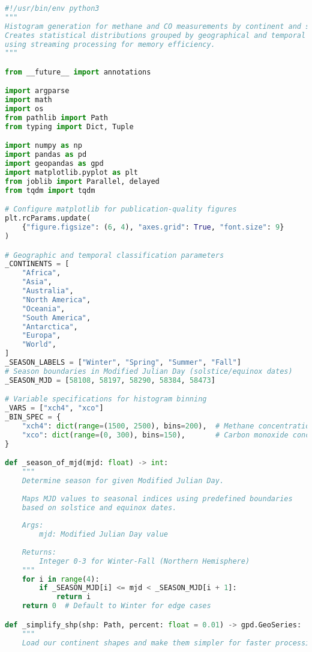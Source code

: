 \begin{lstlisting}[language=Python, caption=Histogram Generation Algorithm, label=alg:step03_histos, breaklines=true]
#!/usr/bin/env python3
"""
Histogram generation for methane and CO measurements by continent and season.
Creates statistical distributions grouped by geographical and temporal classifications
using streaming processing for memory efficiency.
"""

from __future__ import annotations

import argparse
import math
import os
from pathlib import Path
from typing import Dict, Tuple

import numpy as np
import pandas as pd
import geopandas as gpd
import matplotlib.pyplot as plt
from joblib import Parallel, delayed
from tqdm import tqdm

# Configure matplotlib for publication-quality figures
plt.rcParams.update(
    {"figure.figsize": (6, 4), "axes.grid": True, "font.size": 9}
)

# Geographic and temporal classification parameters
_CONTINENTS = [
    "Africa",
    "Asia",
    "Australia",
    "North America",
    "Oceania",
    "South America",
    "Antarctica",
    "Europa",
    "World",
]
_SEASON_LABELS = ["Winter", "Spring", "Summer", "Fall"]
# Season boundaries in Modified Julian Day (solstice/equinox dates)
_SEASON_MJD = [58108, 58197, 58290, 58384, 58473]

# Variable specifications for histogram binning
_VARS = ["xch4", "xco"]
_BIN_SPEC = {
    "xch4": dict(range=(1500, 2500), bins=200),  # Methane concentration range
    "xco": dict(range=(0, 300), bins=150),       # Carbon monoxide concentration range
}

def _season_of_mjd(mjd: float) -> int:
    """
    Determine season for given Modified Julian Day.
    
    Maps MJD values to seasonal indices using predefined boundaries
    based on solstice and equinox dates.
    
    Args:
        mjd: Modified Julian Day value
        
    Returns:
        Integer 0-3 for Winter-Fall (Northern Hemisphere)
    """
    for i in range(4):
        if _SEASON_MJD[i] <= mjd < _SEASON_MJD[i + 1]:
            return i
    return 0  # Default to Winter for edge cases

def _simplify_shp(shp: Path, percent: float = 0.01) -> gpd.GeoSeries:
    """
    Load our continent shapes and make them simpler for faster processing.
    

\end{lstlisting}
